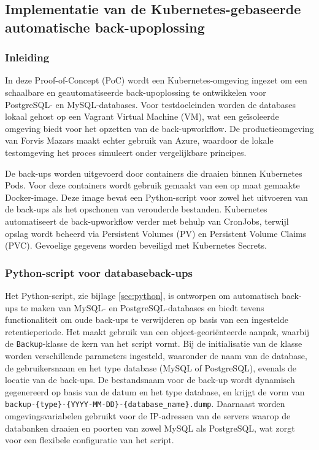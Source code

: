 \subsection{Implementatie van de Kubernetes-gebaseerde automatische back-upoplossing}

\subsubsection{Inleiding}
In deze Proof-of-Concept (PoC) wordt een Kubernetes-omgeving ingezet om een schaalbare en geautomatiseerde back-upoplossing te ontwikkelen voor PostgreSQL- en MySQL-databases. Voor testdoeleinden worden de databases lokaal gehost op een Vagrant Virtual Machine (VM), wat een geïsoleerde omgeving biedt voor het opzetten van de back-upworkflow. De productieomgeving van Forvis Mazars maakt echter gebruik van Azure, waardoor de lokale testomgeving het proces simuleert onder vergelijkbare principes.

De back-ups worden uitgevoerd door containers die draaien binnen Kubernetes Pods. Voor deze containers wordt gebruik gemaakt van een op maat gemaakte Docker-image. Deze image bevat een Python-script voor zowel het uitvoeren van de back-ups als het opschonen van verouderde bestanden. Kubernetes automatiseert de back-upworkflow verder met behulp van CronJobs, terwijl opslag wordt beheerd via Persistent Volumes (PV) en Persistent Volume Claims (PVC). Gevoelige gegevens worden beveiligd met Kubernetes Secrets.

\subsubsection{Python-script voor databaseback-ups}
Het Python-script, zie bijlage \ref{sec:python}, is ontworpen om automatisch back-ups te maken van MySQL- en PostgreSQL-databases en biedt tevens functionaliteit om oude back-ups te verwijderen op basis van een ingestelde retentieperiode. Het maakt gebruik van een object-georiënteerde aanpak, waarbij de \texttt{Backup}-klasse de kern van het script vormt. Bij de initialisatie van de klasse worden verschillende parameters ingesteld, waaronder de naam van de database, de gebruikersnaam en het type database (MySQL of PostgreSQL), evenals de locatie van de back-ups. De bestandsnaam voor de back-up wordt dynamisch gegenereerd op basis van de datum en het type database, en krijgt de vorm van \texttt{backup-\{type\}-\{YYYY-MM-DD\}-\{database\_name\}.dump}. Daarnaast worden omgevingsvariabelen gebruikt voor de IP-adressen van de servers waarop de databanken draaien en poorten van zowel MySQL als PostgreSQL, wat zorgt voor een flexibele configuratie van het script.

